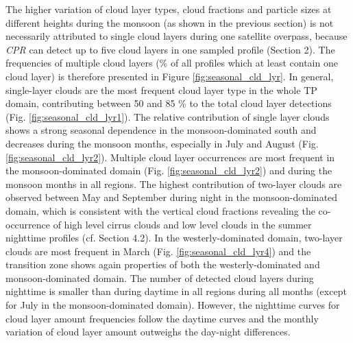 \documentclass[alpha-refs]{wiley-article}
\begin{document}
The higher variation of cloud layer types, cloud fractions and particle sizes at different heights during the monsoon (as shown in the previous section) is not necessarily attributed to single cloud layers during one satellite overpass, because \textit{CPR} can detect up to five cloud layers in one sampled profile (Section 2). The frequencies of multiple cloud layers (\% of all profiles which at least contain one cloud layer) is therefore presented in Figure \ref{fig:seasonal_cld_lyr}. In general, single-layer clouds are the most frequent cloud layer type in the whole TP domain, contributing between 50 and 85 \% to the total cloud layer detections (Fig. \ref{fig:seasonal_cld_lyr1}). The relative contribution of single layer clouds shows a strong seasonal dependence in the monsoon-dominated south and decreases during the monsoon months, especially in July and August (Fig. \ref{fig:seasonal_cld_lyr2}). Multiple cloud layer occurrences are most frequent in the monsoon-dominated domain (Fig. \ref{fig:seasonal_cld_lyr2}) and during the monsoon months in all regions. The highest contribution of two-layer clouds are observed between May and September during night in the monsoon-dominated domain, which is consistent with the vertical cloud fractions revealing the co-occurrence of high level cirrus clouds and low level clouds in the summer nighttime profiles (cf. Section 4.2). In the westerly-dominated domain, two-layer clouds are most frequent in March (Fig. \ref{fig:seasonal_cld_lyr4}) and the transition zone shows again properties of both the westerly-dominated and monsoon-dominated domain. The number of detected cloud layers during nighttime is smaller than during daytime in all regions during all months (except for July in the monsoon-dominated domain). However, the nighttime curves for cloud layer amount frequencies follow the daytime curves and the monthly variation of cloud layer amount outweighs the day-night differences. 
\end{document}
